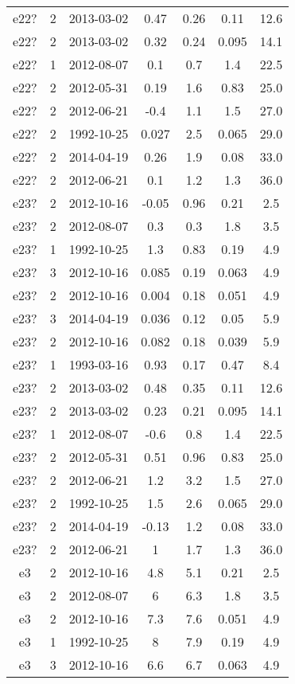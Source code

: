 \begin{table*}[htp]
\begin{tabular}{ccccccc}
e22? & 2 & 2013-03-02 & 0.47 & 0.26 & 0.11 & 12.6 \\
e22? & 2 & 2013-03-02 & 0.32 & 0.24 & 0.095 & 14.1 \\
e22? & 1 & 2012-08-07 & 0.1 & 0.7 & 1.4 & 22.5 \\
e22? & 2 & 2012-05-31 & 0.19 & 1.6 & 0.83 & 25.0 \\
e22? & 2 & 2012-06-21 & -0.4 & 1.1 & 1.5 & 27.0 \\
e22? & 2 & 1992-10-25 & 0.027 & 2.5 & 0.065 & 29.0 \\
e22? & 2 & 2014-04-19 & 0.26 & 1.9 & 0.08 & 33.0 \\
e22? & 2 & 2012-06-21 & 0.1 & 1.2 & 1.3 & 36.0 \\
e23? & 2 & 2012-10-16 & -0.05 & 0.96 & 0.21 & 2.5 \\
e23? & 2 & 2012-08-07 & 0.3 & 0.3 & 1.8 & 3.5 \\
e23? & 1 & 1992-10-25 & 1.3 & 0.83 & 0.19 & 4.9 \\
e23? & 3 & 2012-10-16 & 0.085 & 0.19 & 0.063 & 4.9 \\
e23? & 2 & 2012-10-16 & 0.004 & 0.18 & 0.051 & 4.9 \\
e23? & 3 & 2014-04-19 & 0.036 & 0.12 & 0.05 & 5.9 \\
e23? & 2 & 2012-10-16 & 0.082 & 0.18 & 0.039 & 5.9 \\
e23? & 1 & 1993-03-16 & 0.93 & 0.17 & 0.47 & 8.4 \\
e23? & 2 & 2013-03-02 & 0.48 & 0.35 & 0.11 & 12.6 \\
e23? & 2 & 2013-03-02 & 0.23 & 0.21 & 0.095 & 14.1 \\
e23? & 1 & 2012-08-07 & -0.6 & 0.8 & 1.4 & 22.5 \\
e23? & 2 & 2012-05-31 & 0.51 & 0.96 & 0.83 & 25.0 \\
e23? & 2 & 2012-06-21 & 1.2 & 3.2 & 1.5 & 27.0 \\
e23? & 2 & 1992-10-25 & 1.5 & 2.6 & 0.065 & 29.0 \\
e23? & 2 & 2014-04-19 & -0.13 & 1.2 & 0.08 & 33.0 \\
e23? & 2 & 2012-06-21 & 1 & 1.7 & 1.3 & 36.0 \\
e3 & 2 & 2012-10-16 & 4.8 & 5.1 & 0.21 & 2.5 \\
e3 & 2 & 2012-08-07 & 6 & 6.3 & 1.8 & 3.5 \\
e3 & 2 & 2012-10-16 & 7.3 & 7.6 & 0.051 & 4.9 \\
e3 & 1 & 1992-10-25 & 8 & 7.9 & 0.19 & 4.9 \\
e3 & 3 & 2012-10-16 & 6.6 & 6.7 & 0.063 & 4.9 \\

\end{tabular}
\end{table*}
